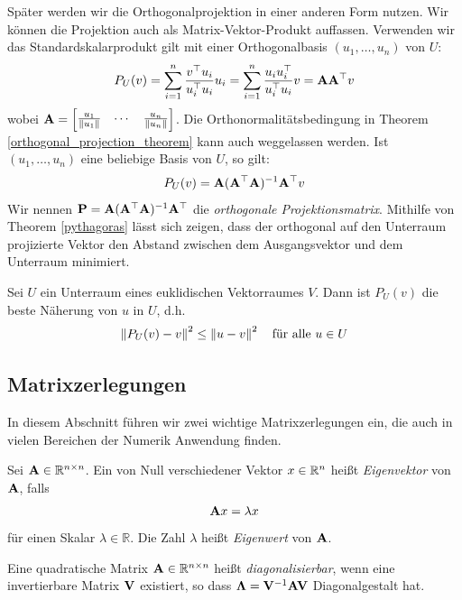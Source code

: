 Später werden wir die Orthogonalprojektion in einer anderen Form nutzen. Wir können die Projektion auch als Matrix-Vektor-Produkt auffassen. Verwenden wir das Standardskalarprodukt gilt mit einer Orthogonalbasis $(u_1, \ldots, u_n)$ von $U$:
\begin{align}
P_U(v) = \sum_{i=1}^n \frac{v^{\top} u_i}{u_i^{\top} u_i} u_i = \sum_{i=1}^n \frac{u_i u_i^{\top}}{u_i^{\top} u_i}v = \mathbf{A} \mathbf{A}^{\top} v
\end{align}
wobei $\mathbf{A} = \begin{bmatrix} \frac{u_1}{\left\lVert u_1 \right\rVert} & \cdots & \frac{u_n}{\left\lVert u_n \right\rVert} \end{bmatrix}$. Die Orthonormalitätsbedingung in Theorem \ref{orthogonal_projection_theorem} kann auch weggelassen werden. Ist $(u_{1},\ldots ,u_{n})$ eine beliebige Basis von $U$, so gilt:
\begin{align}
P_U(v) = \mathbf{A} (\mathbf{A}^\top \mathbf{A})^{-1} \mathbf{A}^\top v
\end{align}
Wir nennen $\mathbf{P} = \mathbf{A} (\mathbf{A}^\top \mathbf{A})^{-1} \mathbf{A}^\top$ die \textit{orthogonale Projektionsmatrix}. Mithilfe von Theorem \ref{pythagoras} lässt sich zeigen, dass der orthogonal auf den Unterraum projizierte Vektor den Abstand zwischen dem Ausgangsvektor und dem Unterraum minimiert.

\begin{thm}
Sei $U$ ein Unterraum eines euklidischen Vektorraumes $V$. Dann ist $P_U(v)$ die beste Näherung von $u$ in $U$, d.h.
$$\left\lVert P_U(v) - v \right\rVert^2 \leq \left\lVert u - v \right\rVert^2 \quad \text{für alle } u \in U$$
\end{thm}


\subsection{Matrixzerlegungen}
\label{matrix_decomposition}

In diesem Abschnitt führen wir zwei wichtige Matrixzerlegungen ein, die auch in vielen Bereichen der Numerik Anwendung finden.

\begin{defn}
Sei $\mathbf{A} \in \mathbb{R}^{n \times n}$. Ein von Null verschiedener Vektor $x \in \mathbb{R}^n$ heißt \textit{Eigenvektor} von $\mathbf{A}$, falls
$$\mathbf{A}x = \lambda x$$
für einen Skalar $\lambda \in \mathbb{R}$. Die Zahl $\lambda$ heißt \textit{Eigenwert} von $\mathbf{A}$.
\end{defn}

\begin{defn}
Eine quadratische Matrix $\mathbf{A} \in \mathbb{R}^{n \times n}$ heißt \textit{diagonalisierbar}, wenn eine invertierbare Matrix $\mathbf{V}$ existiert, so dass $\mathbf{\Lambda} = \mathbf{V}^{-1}\mathbf{A}\mathbf{V}$ Diagonalgestalt hat.
\end{defn}

